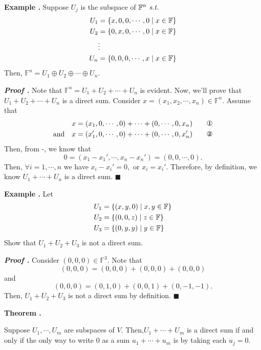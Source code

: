 \documentclass[11pt, letterpaper]{article}
\newcounter{neg}[subsection]
\newenvironment*{eg}{\par\noindent\textbf{Example \thesubsection.\stepcounter{neg}\theneg}}{\par}
\newcounter{nthm}[subsection]
\newenvironment*{thm}[1]{\begin{framed}\par\noindent\textbf{Theorem \thesubsection.\stepcounter{nthm}\thenthm\ #1} \par}{\par\end{framed}}
\newcounter{nprf}[subsection]
\newenvironment*{prf}{\par\noindent\textbf{\textit{Proof \stepcounter{nprf}\thenprf.}}}{\hfill$\blacksquare$\par}
\def\F{\mathbb{F}}
\def\st{\emph{ s.t. }}
\begin{document}
\begin{eg}\label{eg1.3.5}
	Suppose $U_j$ is the subspace of $\F^n\st$\[\begin{aligned}U_1&=\qty{x,0,0,\cdots,0\mid x\in\F}\\U_2&=\qty{0,x,0,\cdots,0\mid x\in\F}\\&\vdots\\U_n&=\qty{0,0,0,\cdots,x\mid x\in\F}\end{aligned}\] Then, $\F^n=U_1\oplus U_2\oplus\cdots\oplus U_n.$
	\begin{prf}
		Note that $\F^n=U_1+U_2+\cdots+U_n$ is evident. Now, we'll prove that $U_1+U_2+\cdots+U_n$ is a direct sum. Consider $x=(x_1,x_2,\cdots,x_n)\in\F^n.$ Assume that \[\begin{aligned}x&=(x_1,0,\cdots,0)+\cdots+(0,\cdots,0,x_n)\qquad\text{\ding{172}}\\\text{and}\quad x&=(x_1',0,\cdots,0)+\cdots+(0,\cdots,0,x_n')\qquad\text{\ding{173}}\end{aligned}\] Then, from -, we know that \[0=(x_1-x_1',\cdots,x_n-x_n')=(0,0,\cdots,0).\] Then, $\forall i=1,\cdots,n$ we have $x_i-x_i'=0,$ or $x_i=x_i'.$ Therefore, by definition, we know $U_1+\cdots+U_n$ is a direct sum. 
	\end{prf}
\end{eg}
\begin{eg}\label{eg1.3.6}
	Let \[\begin{aligned}U_1&=\qty{(x,y,0)\mid x,y\in\F}\\U_2&=\qty{(0,0,z)\mid z\in\F}\\U_3&=\qty{(0,y,y)\mid y\in\F}\end{aligned}\] Show that $U_1+U_2+U_3$ is not a direct sum.
	\begin{prf}
		Consider $(0,0,0)\in\F^3.$ Note that \[(0,0,0)=(0,0,0)+(0,0,0)+(0,0,0)\] and \[(0,0,0)=(0,1,0)+(0,0,1)+(0,-1,-1).\] Then, $U_1+U_2+U_3$ is not a direct sum by definition. 
	\end{prf}
\end{eg}
\begin{thm}{}\label{1.12}
	Suppose	$U_1,\cdots,U_m$ are subspaces of $V$. Then,$U_1+\cdots+U_m$ is a direct sum if and only if the only way to write $0$ as a sum $u_1+\cdots+u_m$ is by taking each $u_j=0.$
\end{thm}
\end{document}
